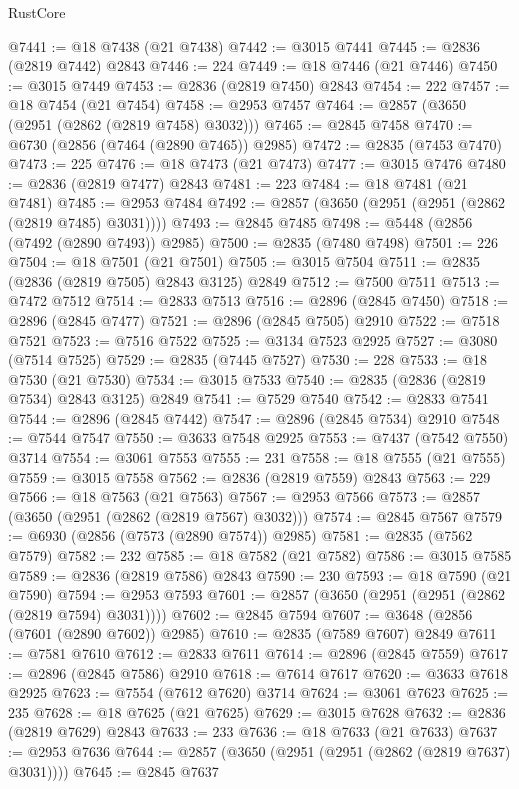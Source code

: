 \begin{lexlean}{RustCore}
\begin{coremodule}
@7441 := @18 @7438 (@21 @7438)
@7442 := @3015 @7441
@7445 := @2836 (@2819 @7442) @2843
@7446 := 224
@7449 := @18 @7446 (@21 @7446)
@7450 := @3015 @7449
@7453 := @2836 (@2819 @7450) @2843
@7454 := 222
@7457 := @18 @7454 (@21 @7454)
@7458 := @2953 @7457
@7464 := @2857 (@3650 (@2951 (@2862 (@2819 @7458) @3032)))
@7465 := @2845 @7458
@7470 := @6730 (@2856 (@7464 (@2890 @7465)) @2985)
@7472 := @2835 (@7453 @7470)
@7473 := 225
@7476 := @18 @7473 (@21 @7473)
@7477 := @3015 @7476
@7480 := @2836 (@2819 @7477) @2843
@7481 := 223
@7484 := @18 @7481 (@21 @7481)
@7485 := @2953 @7484
@7492 := @2857 (@3650 (@2951 (@2951 (@2862 (@2819 @7485) @3031))))
@7493 := @2845 @7485
@7498 := @5448 (@2856 (@7492 (@2890 @7493)) @2985)
@7500 := @2835 (@7480 @7498)
@7501 := 226
@7504 := @18 @7501 (@21 @7501)
@7505 := @3015 @7504
@7511 := @2835 (@2836 (@2819 @7505) @2843 @3125) @2849
@7512 := @7500 @7511
@7513 := @7472 @7512
@7514 := @2833 @7513
@7516 := @2896 (@2845 @7450)
@7518 := @2896 (@2845 @7477)
@7521 := @2896 (@2845 @7505) @2910
@7522 := @7518 @7521
@7523 := @7516 @7522
@7525 := @3134 @7523 @2925
@7527 := @3080 (@7514 @7525)
@7529 := @2835 (@7445 @7527)
@7530 := 228
@7533 := @18 @7530 (@21 @7530)
@7534 := @3015 @7533
@7540 := @2835 (@2836 (@2819 @7534) @2843 @3125) @2849
@7541 := @7529 @7540
@7542 := @2833 @7541
@7544 := @2896 (@2845 @7442)
@7547 := @2896 (@2845 @7534) @2910
@7548 := @7544 @7547
@7550 := @3633 @7548 @2925
@7553 := @7437 (@7542 @7550) @3714
@7554 := @3061 @7553
@7555 := 231
@7558 := @18 @7555 (@21 @7555)
@7559 := @3015 @7558
@7562 := @2836 (@2819 @7559) @2843
@7563 := 229
@7566 := @18 @7563 (@21 @7563)
@7567 := @2953 @7566
@7573 := @2857 (@3650 (@2951 (@2862 (@2819 @7567) @3032)))
@7574 := @2845 @7567
@7579 := @6930 (@2856 (@7573 (@2890 @7574)) @2985)
@7581 := @2835 (@7562 @7579)
@7582 := 232
@7585 := @18 @7582 (@21 @7582)
@7586 := @3015 @7585
@7589 := @2836 (@2819 @7586) @2843
@7590 := 230
@7593 := @18 @7590 (@21 @7590)
@7594 := @2953 @7593
@7601 := @2857 (@3650 (@2951 (@2951 (@2862 (@2819 @7594) @3031))))
@7602 := @2845 @7594
@7607 := @3648 (@2856 (@7601 (@2890 @7602)) @2985)
@7610 := @2835 (@7589 @7607) @2849
@7611 := @7581 @7610
@7612 := @2833 @7611
@7614 := @2896 (@2845 @7559)
@7617 := @2896 (@2845 @7586) @2910
@7618 := @7614 @7617
@7620 := @3633 @7618 @2925
@7623 := @7554 (@7612 @7620) @3714
@7624 := @3061 @7623
@7625 := 235
@7628 := @18 @7625 (@21 @7625)
@7629 := @3015 @7628
@7632 := @2836 (@2819 @7629) @2843
@7633 := 233
@7636 := @18 @7633 (@21 @7633)
@7637 := @2953 @7636
@7644 := @2857 (@3650 (@2951 (@2951 (@2862 (@2819 @7637) @3031))))
@7645 := @2845 @7637

\end{coremodule}
\end{lexlean}
